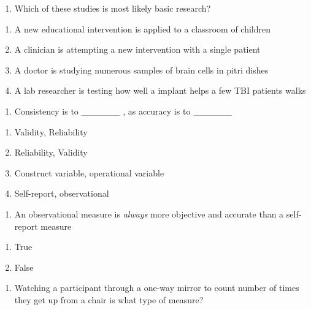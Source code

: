 \documentclass[
  12pt,
  letterpaper,
  DIV=11,
  numbers=noendperiod]{scrartcl}
\providecommand{\tightlist}{%
  \setlength{\itemsep}{0pt}\setlength{\parskip}{0pt}}\usepackage{longtable,booktabs,array}
\begin{document}
\begin{enumerate}
\def\labelenumi{\arabic{enumi}.}
\setcounter{enumi}{20}
\tightlist
\item
  Which of these studies is most likely basic research?
\end{enumerate}

\begin{enumerate}
\def\labelenumi{\alph{enumi}.}
\tightlist
\item
  A new educational intervention is applied to a classroom of children
\item
  A clinician is attempting a new intervention with a single patient
\item
  A doctor is studying numerous samples of brain cells in pitri dishes
\item
  A lab researcher is testing how well a implant helps a few TBI
  patients walks
\end{enumerate}

\begin{enumerate}
\def\labelenumi{\arabic{enumi}.}
\setcounter{enumi}{21}
\tightlist
\item
  Consistency is to \_\_\_\_\_\_ , as accuracy is to \_\_\_\_\_\_
\end{enumerate}

\begin{enumerate}
\def\labelenumi{\alph{enumi}.}
\tightlist
\item
  Validity, Reliability
\item
  Reliability, Validity
\item
  Construct variable, operational variable
\item
  Self-report, observational
\end{enumerate}

\begin{enumerate}
\def\labelenumi{\arabic{enumi}.}
\setcounter{enumi}{22}
\tightlist
\item
  An observational measure is \emph{always} more objective and accurate
  than a self-report measure
\end{enumerate}

\begin{enumerate}
\def\labelenumi{\alph{enumi}.}
\tightlist
\item
  True
\item
  False
\end{enumerate}

\newpage{}

\begin{enumerate}
\def\labelenumi{\arabic{enumi}.}
\setcounter{enumi}{23}
\tightlist
\item
  Watching a participant through a one-way mirror to count number of
  times they get up from a chair is what type of measure?
\end{enumerate}
\end{document}
